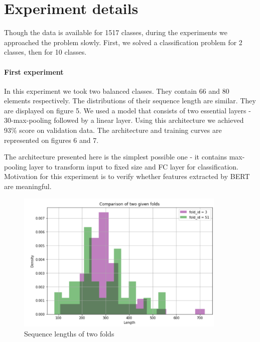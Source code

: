 \documentclass[12pt, twoside]{article}
\begin{document}
\section{Experiment details}
Though the data is available for 1517 classes, during the experiments we approached the problem slowly. First, we solved a classification problem for 2 classes, then for 10 classes.

\paragraph{First experiment}
\noindent In this experiment we took two balanced classes. They contain 66 and 80 elements respectively. The distributions of their sequence length are similar. They are displayed on figure 5. We used a model that consists of two essential layers - 30-max-pooling followed by a linear layer. Using this architecture we achieved 93\% score on validation data. The architecture and training curves are represented on figures 6 and 7.  

The architecture presented here is the simplest possible one - it contains max-pooling layer to transform input to fixed size and FC layer for classification. Motivation for this experiment is to verify whether features extracted by BERT are meaningful.

\begin{figure}[htp]
    \centering
    \includegraphics[width=10cm]{figures/figure5.pdf}
    \caption{Sequence lengths of two folds}
\end{figure}
\end{document}
